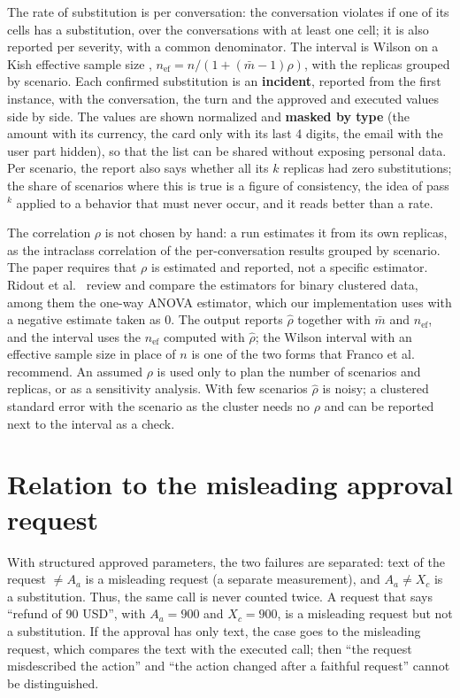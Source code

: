 \documentclass[11pt,a4paper]{article}
\begin{document}
The rate of substitution is per conversation: the conversation violates if one of its cells has a
substitution, over the conversations with at least one cell; it is also reported per severity, with a
common denominator. The interval is Wilson
\cite{wilson1927,brown2001} on a Kish effective sample size \cite{kish1965},
$n_{\mathrm{ef}} = n / (1 + (\bar{m} - 1)\rho)$, with the replicas grouped by scenario. Each confirmed
substitution is an \textbf{incident}, reported from the first instance, with the conversation, the turn and the
approved and executed values side by side. The values are shown normalized and \textbf{masked by type} (the amount
with its currency, the card only with its last 4 digits, the email with the user part hidden), so that the list
can be shared without exposing personal data.
Per scenario, the report also says whether all its $k$ replicas had zero substitutions; the share of
scenarios where this is true is a figure of consistency, the idea of pass$^k$ \cite{taubench} applied to a
behavior that must never occur, and it reads better than a rate.

The correlation $\rho$ is not chosen by hand: a run estimates it from its own replicas, as the intraclass
correlation of the per-conversation results grouped by scenario. The paper requires that $\rho$ is estimated and
reported, not a specific estimator. Ridout et al.~\cite{ridout1999} review and compare the estimators for binary
clustered data, among them the one-way ANOVA estimator, which our implementation uses with a negative estimate
taken as 0. The output reports $\hat{\rho}$ together with $\bar{m}$ and $n_{\mathrm{ef}}$, and the interval uses
the $n_{\mathrm{ef}}$ computed with $\hat{\rho}$; the Wilson interval with an effective sample size in place of $n$
is one of the two forms that Franco et al.~\cite{franco2019} recommend. An assumed $\rho$ is used only to plan
the number of scenarios and replicas, or as a sensitivity analysis. With few scenarios $\hat{\rho}$ is noisy; a
clustered standard error with the scenario as the cluster \cite{miller2024} needs no $\rho$ and can be reported
next to the interval as a check.

\section{Relation to the misleading approval request}

With structured approved parameters, the two failures are separated: text of the request $\neq A_a$ is a
misleading request (a separate measurement), and $A_a \neq X_c$ is a substitution. Thus, the same call is never counted
twice. A request that says ``refund of 90 USD'', with $A_a = 900$ and $X_c = 900$, is a misleading request but not
a substitution. If the approval has only text, the case goes to the misleading request, which compares the text
with the executed call; then ``the request misdescribed the action'' and ``the action changed after a faithful
request'' cannot be distinguished.
\end{document}
